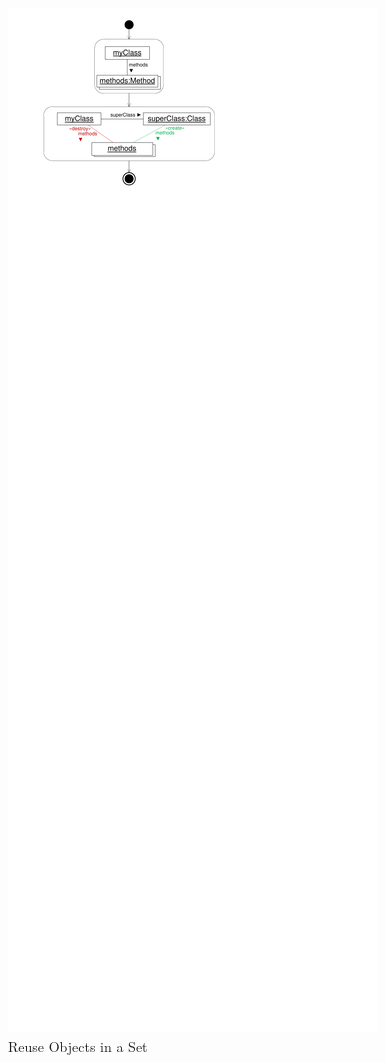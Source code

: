 {\begin{figure}[htb]
		\centering
		\includegraphics[scale=.8]{figures/ReuseObjectSet1}
  	\caption{Reuse Objects in a Set}
  	\label{fig:reuseObjSet1}
\end{figure}

}
